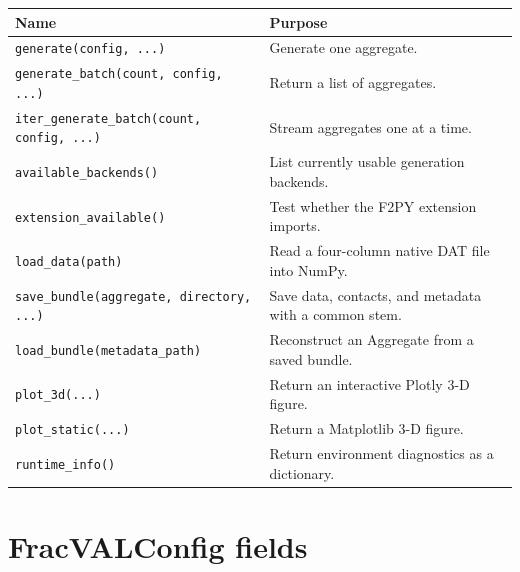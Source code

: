 \documentclass[11pt,oneside]{report}
\newcommand{\code}[1]{\texttt{#1}}
\begin{document}
\begin{longtable}{p{}p{}}
\toprule
Name & Purpose \\
\midrule
\code{generate(config, ...)} & Generate one aggregate. \\
\code{generate\_batch(count, config, ...)} & Return a list of aggregates. \\
\code{iter\_generate\_batch(count, config, ...)} & Stream aggregates one at a time. \\
\code{available\_backends()} & List currently usable generation backends. \\
\code{extension\_available()} & Test whether the F2PY extension imports. \\
\code{load\_data(path)} & Read a four-column native DAT file into NumPy. \\
\code{save\_bundle(aggregate, directory, ...)} & Save data, contacts, and metadata with a common stem. \\
\code{load\_bundle(metadata\_path)} & Reconstruct an Aggregate from a saved bundle. \\
\code{plot\_3d(...)} & Return an interactive Plotly 3-D figure. \\
\code{plot\_static(...)} & Return a Matplotlib 3-D figure. \\
\code{runtime\_info()} & Return environment diagnostics as a dictionary. \\
\bottomrule
\end{longtable}

\section{FracVALConfig fields}
\end{document}
